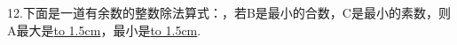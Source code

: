 \question 12.下面是一道有余数的整数除法算式：，若B是最小的合数，C是最小的素数，则A最大是\underline{\hbox to 1.5cm{}}，最小是\underline{\hbox to 1.5cm{}}.